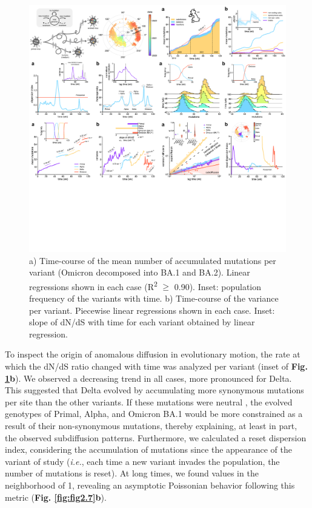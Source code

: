 \begin{figure}[ht!]
    \centering
    \includegraphics[trim={0.2cm 13.5cm 25.35cm 22.5cm},clip, width=\linewidth]{assets/Ch2Fig.pdf}
    \caption{a) Time-course of the mean number of accumulated mutations per variant (Omicron decomposed into BA.1 and BA.2). Linear regressions shown in each case (R\textsuperscript{2} $\geq$ 0.90). Inset: population frequency of the variants with time. b) Time-course of the variance per variant. Piecewise linear regressions shown in each case. Inset: slope of dN/dS with time for each variant obtained by linear regression.}\label{fig:fig2.6}
\end{figure}

To inspect the origin of anomalous diffusion in evolutionary motion, the rate at which the dN/dS ratio changed with time was analyzed per variant (inset of \textbf{Fig. \ref{fig:fig2.6}b}). We observed a decreasing trend in all cases, more pronounced for Delta. This suggested that Delta evolved by accumulating more synonymous mutations per site than the other variants. If these mutations were neutral \cite{deMaio2021}, the evolved genotypes of Primal, Alpha, and Omicron BA.1 would be more constrained as a result of their non-synonymous mutations, thereby explaining, at least in part, the observed subdiffusion patterns. Furthermore, we calculated a reset dispersion index, considering the accumulation of mutations since the appearance of the variant of study (\textit{i.e.}, each time a new variant invades the population, the number of mutations is reset). At long times, we found values in the neighborhood of 1, revealing an asymptotic Poissonian behavior following this metric (\textbf{Fig. \ref{fig:fig2.7}b}).

